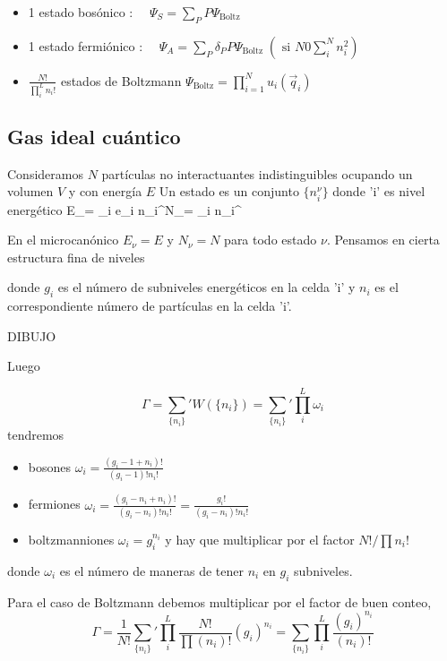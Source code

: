 \documentclass[10pt,oneside]{CBFT_book}
\begin{document}
\begin{itemize}
\item 1 estado bosónico : $ \quad \Psi_S = \sum_P P \Psi_{\text{Boltz}}$
\item 1 estado fermiónico : $ \quad \Psi_A = \sum_P \delta_P P \Psi_{\text{Boltz}} 
	\; (\text{ si } N 0 \sum_i^N n_i^2 )$
\item $ \frac{N!}{\prod_i^L n_i!} $ estados de Boltzmann $ \Psi_{\text{Boltz}} = \prod_{i=1}^N u_i(\vec{q}_i) $
\end{itemize}


\subsection{Gas ideal cuántico}

Consideramos $N$ partículas no interactuantes indistinguibles ocupando un volumen $V$ y con energía $E$
Un estado es un conjunto $ \{ n_i^\nu \} $ donde 'i' es nivel energético
\be
	E_\nu = \sum_i e_i n_i^\nu \qquad \qquad N_\nu = \sum_i n_i^\nu
	\label{cond_EN}
\ee

En el microcanónico $ E_\nu = E $ y $ N_\nu = N $ para todo estado $\nu$. Pensamos en cierta estructura 
fina de niveles


donde $g_i$ es el número de subniveles energéticos en la celda 'i' y $n_i$ es el correspondiente número de
partículas en la celda 'i'.

DIBUJO

Luego

\[
	\Gamma = \sum_{ \{ n_i \} }' W(\{ n_i \}) = \sum_{ \{ n_i \} }' \prod_i^L  \omega_i 
\]
tendremos
\begin{itemize}
 \item bosones $ \omega_i = \frac{ ( g_i - 1 + n_i)! }{ (g_i - 1)!n_i!} $
 \item fermiones $ \omega_i = \frac{ ( g_i - n_i + n_i )! }{ (g_i - n_i)!n_i!} =
		\frac{ g_i! }{ (g_i -n_i )! n_i!}$
 \item boltzmanniones $ \omega_i = g_i^{n_i} $ y hay que multiplicar por el factor
		$ N! / \prod n_i! $
\end{itemize}
donde $ \omega_i $ es el número de maneras de tener $ n_i $ en $ g_i $ subniveles.

Para el caso de Boltzmann debemos multiplicar por el factor de buen conteo,
\[
	\Gamma = \frac{1}{N!} \sum_{ \{ n_i \} }' \prod_i^L \frac{N!}{\prod (n_i)!}(g_i)^{n_i}
	= \sum_{ \{ n_i \} } \prod_i^L \frac{ (g_i)^{n_i} }{ (n_i)! }
\]
\end{document}
